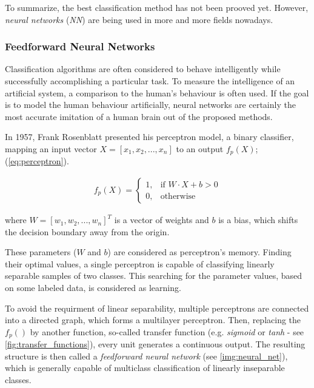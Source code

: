 To summarize, the best classification method has not been prooved yet. However, \textit{neural networks} (\textit{NN}) are being used in more and more fields nowadays.  

\subsubsection*{Feedforward Neural Networks} \label{ssec:intro_to_nn}
Classification algorithms are often considered to behave intelligently while successfully accomplishing a particular task. To measure the intelligence of an artificial system, a comparison to the human's behaviour is often used. If the goal is to model the human behaviour artificially, neural networks are certainly the most accurate imitation of a human brain out of the proposed methods.

In 1957, Frank Rosenblatt presented his perceptron model, a binary classifier, mapping an input vector $ X = [x_1, x_2, ..., x_n] $ to an output $ f_p(X) $; (\cref{eq:perceptron}).

\begin{align} \label{eq:perceptron}
f_p(X) = 
\begin{cases}
    1, & \text{if }  W \cdot X + b > 0\\
    0,              & \text{otherwise}
\end{cases}
\end{align}

where $ W = [w_1, w_2, ..., w_n]^T $ is a vector of weights and $ b $ is a bias, which shifts the decision boundary away from the origin.

These parameters ($ W $ and $ b $) are considered as perceptron's memory. Finding their optimal values, a single perceptron is capable of classifying linearly separable samples of two classes. This searching for the parameter values, based on some labeled data, is considered as learning.

To avoid the requirment of linear separability, multiple perceptrons are connected into a directed graph, which forms a multilayer perceptron. Then, replacing the $ f_p() $ by another function, so-called transfer function (e.g. \textit{sigmoid} or \textit{tanh} - see \cref{fig:transfer_functions}), every unit generates a continuous output. The resulting structure is then called a \textit{feedforward neural network} (see \cref{img:neural_net}), which is generally capable of multiclass classification of linearly inseparable classes.

